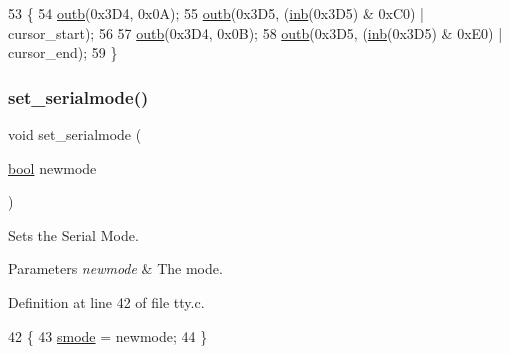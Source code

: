 \begin{DoxyCode}
53 \{
54     \hyperlink{a00164_aa37f5841c54156a4b14fc0d6f626b44f_aa37f5841c54156a4b14fc0d6f626b44f}{outb}(0x3D4, 0x0A);
55     \hyperlink{a00164_aa37f5841c54156a4b14fc0d6f626b44f_aa37f5841c54156a4b14fc0d6f626b44f}{outb}(0x3D5, (\hyperlink{a00164_a0223c8898dfec29069879dc51076e28a_a0223c8898dfec29069879dc51076e28a}{inb}(0x3D5) & 0xC0) | cursor\_start);
56  
57     \hyperlink{a00164_aa37f5841c54156a4b14fc0d6f626b44f_aa37f5841c54156a4b14fc0d6f626b44f}{outb}(0x3D4, 0x0B);
58     \hyperlink{a00164_aa37f5841c54156a4b14fc0d6f626b44f_aa37f5841c54156a4b14fc0d6f626b44f}{outb}(0x3D5, (\hyperlink{a00164_a0223c8898dfec29069879dc51076e28a_a0223c8898dfec29069879dc51076e28a}{inb}(0x3D5) & 0xE0) | cursor\_end);
59 \}
\end{DoxyCode}
\mbox{\label{a00182_ab1cdfeb7dac30904e66f81ab673ed8ca_ab1cdfeb7dac30904e66f81ab673ed8ca}} 
\subsubsection{\texorpdfstring{set\+\_\+serialmode()}{set\_serialmode()}}
{\footnotesize\ttfamily void set\+\_\+serialmode (\begin{DoxyParamCaption}\item[{\hyperlink{a00140_af6a258d8f3ee5206d682d799316314b1_af6a258d8f3ee5206d682d799316314b1}{bool}}]{newmode }\end{DoxyParamCaption})}



Sets the Serial Mode. 


\begin{DoxyParams}{Parameters}
{\em newmode} & The mode. \\
\hline
\end{DoxyParams}


Definition at line 42 of file tty.\+c.


\begin{DoxyCode}
42                                   \{
43     \hyperlink{a00179_a22b8d30f7aee33f172c1239aed53e7db_a22b8d30f7aee33f172c1239aed53e7db}{smode} = newmode;
44 \}
\end{DoxyCode}
\mbox{\label{a00182_aaf55ee008e2e63ca97eacae371646db7_aaf55ee008e2e63ca97eacae371646db7}} 
